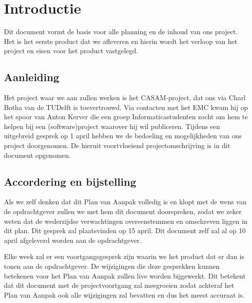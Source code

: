 \section{Introductie}

Dit document vormt de basis voor alle planning en de inhoud van ons project.
Het is het eerste product dat we afleveren en hierin wordt het verloop van het project en eisen voor het product vastgelegd.

\subsection{Aanleiding}

Het project waar we aan zullen werken is het CASAM-project, dat ons via Charl Botha van de TUDelft is toevertrouwd.
Via contacten met het EMC kwam hij op het spoor van Anton Kerver die een groep Informaticastudenten zocht om hem te helpen bij een (software)project waarover hij wil publiceren.
Tijdens een uitgebreid gesprek op 1 april hebben we de bedoeling en mogelijkheden van ons project doorgenomen.
De hieruit voortvloeiend projectomschrijving is in dit document opgenomen.

\subsection{Accordering en bijstelling}

Als we zelf denken dat dit Plan van Aanpak volledig is en klopt met de wens van de opdrachtgever zullen we met hem dit document doorspreken, zodat we zeker weten dat de wederzijdse verwachtingen overeenstemmen en omschreven liggen in dit plan.
Dit gesprek zal plaatsvinden op 15 april.
Dit document zelf zal al op 10 april afgeleverd worden aan de opdrachtgever.

Elke week zal er een voortgangsgesprek zijn waarin we het product dat er dan is tonen aan de opdrachtgever.
De wijzigingen die deze gesprekken kunnen betekenen voor het Plan van Aanpak zullen live worden bijgewerkt.
Dit betekent dat dit document met de projectvoortgang zal meegroeien zodat achteraf het Plan van Aanpak ook alle wijzigingen zal bevatten en dus het meest accuraat is.


